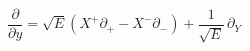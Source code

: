 \begin{equation*}
\frac{\partial }{\partial y}=\sqrt{E}\left( X^{+}\partial _{+}-X^{-}\partial
_{-}\right) +\frac{1}{\sqrt{E}}\,\partial _{Y}
\end{equation*}

